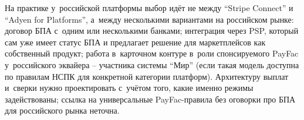 На практике у~российской платформы выбор идёт не между \enquote{Stripe
Connect} и \enquote{Adyen for Platforms}, а~между несколькими
вариантами на российском рынке: договор БПА с~одним или несколькими
банками; интеграция через PSP, который сам уже имеет статус БПА и
предлагает решение для маркетплейсов как собственный продукт;
работа в~карточном контуре в~роли спонсируемого PayFac у~российского
эквайера -- участника системы \enquote{Мир} (если такая модель
доступна по правилам НСПК для конкретной категории платформ).
Архитектуру выплат и~сверки нужно проектировать с~учётом того, какие
именно режимы задействованы; ссылка на универсальные PayFac-правила
без оговорки про БПА для российского рынка неточна.
